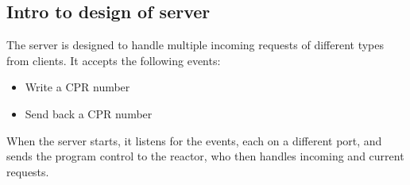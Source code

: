 \documentclass[Main]{subfiles}
\begin{document}
\subsection{Intro to design of server}
The server is designed to handle multiple incoming requests of different types from clients.
It accepts the following events:

\begin{itemize}
\item Write a CPR number
\item Send back a CPR number
\end{itemize}

When the server starts, it listens for the events, each on a different port, and sends the program control to the reactor, who then handles incoming and current requests.
\end{document}
